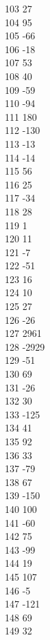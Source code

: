 { 103	27 \\
 104	95 \\
 105	-66 \\
 106	-18 \\
 107	53 \\
 108	40 \\
 109	-59 \\
 110	-94 \\
 111	180 \\
 112	-130 \\
 113	-13 \\
 114	-14 \\
 115	56 \\
 116	25 \\
 117	-34 \\
 118	28 \\
 119	1 \\
 120	11 \\
 121	-7 \\
 122	-51 \\
 123	16 \\
 124	10 \\
 125	27 \\
 126	-26 \\
 127	2961 \\
 128	-2929 \\
 129	-51 \\
 130	69 \\
 131	-26 \\
 132	30 \\
 133	-125 \\
 134	41 \\
 135	92 \\
 136	33 \\
 137	-79 \\
 138	67 \\
 139	-150 \\
 140	100 \\
 141	-60 \\
 142	75 \\
 143	-99 \\
 144	19 \\
 145	107 \\
 146	-5 \\
 147	-121 \\
 148	69 \\
 149	32 \\
}
